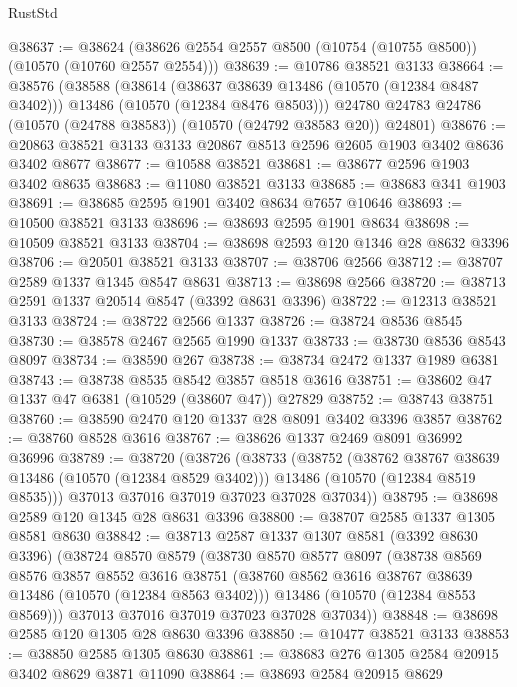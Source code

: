 \begin{lexlean}{RustStd}
\begin{coremodule}
@38637 := @38624 (@38626 @2554 @2557 @8500 (@10754 (@10755 @8500)) (@10570 (@10760 @2557 @2554)))
@38639 := @10786 @38521 @3133
@38664 := @38576
    (@38588
      (@38614
        (@38637 @38639 @13486 (@10570 (@12384 @8487 @3402)))
        @13486
        (@10570 (@12384 @8476 @8503)))
      @24780
      @24783
      @24786
      (@10570 (@24788 @38583))
      (@10570 (@24792 @38583 @20))
      @24801)
@38676 := @20863 @38521 @3133 @3133 @20867 @8513 @2596 @2605 @1903 @3402 @8636 @3402 @8677
@38677 := @10588 @38521
@38681 := @38677 @2596 @1903 @3402 @8635
@38683 := @11080 @38521 @3133
@38685 := @38683 @341 @1903
@38691 := @38685 @2595 @1901 @3402 @8634 @7657 @10646
@38693 := @10500 @38521 @3133
@38696 := @38693 @2595 @1901 @8634
@38698 := @10509 @38521 @3133
@38704 := @38698 @2593 @120 @1346 @28 @8632 @3396
@38706 := @20501 @38521 @3133
@38707 := @38706 @2566
@38712 := @38707 @2589 @1337 @1345 @8547 @8631
@38713 := @38698 @2566
@38720 := @38713 @2591 @1337 @20514 @8547 (@3392 @8631 @3396)
@38722 := @12313 @38521 @3133
@38724 := @38722 @2566 @1337
@38726 := @38724 @8536 @8545
@38730 := @38578 @2467 @2565 @1990 @1337
@38733 := @38730 @8536 @8543 @8097
@38734 := @38590 @267
@38738 := @38734 @2472 @1337 @1989 @6381
@38743 := @38738 @8535 @8542 @3857 @8518 @3616
@38751 := @38602 @47 @1337 @47 @6381 (@10529 (@38607 @47)) @27829
@38752 := @38743 @38751
@38760 := @38590 @2470 @120 @1337 @28 @8091 @3402 @3396 @3857
@38762 := @38760 @8528 @3616
@38767 := @38626 @1337 @2469 @8091 @36992 @36996
@38789 := @38720
    (@38726
      (@38733
        (@38752
          (@38762 @38767 @38639 @13486 (@10570 (@12384 @8529 @3402)))
          @13486
          (@10570 (@12384 @8519 @8535)))
        @37013
        @37016
        @37019
        @37023
        @37028
        @37034))
@38795 := @38698 @2589 @120 @1345 @28 @8631 @3396
@38800 := @38707 @2585 @1337 @1305 @8581 @8630
@38842 := @38713
    @2587
    @1337
    @1307
    @8581
    (@3392 @8630 @3396)
    (@38724
      @8570
      @8579
      (@38730
        @8570
        @8577
        @8097
        (@38738
          @8569
          @8576
          @3857
          @8552
          @3616
          @38751
          (@38760 @8562 @3616 @38767 @38639 @13486 (@10570 (@12384 @8563 @3402)))
          @13486
          (@10570 (@12384 @8553 @8569)))
        @37013
        @37016
        @37019
        @37023
        @37028
        @37034))
@38848 := @38698 @2585 @120 @1305 @28 @8630 @3396
@38850 := @10477 @38521 @3133
@38853 := @38850 @2585 @1305 @8630
@38861 := @38683 @276 @1305 @2584 @20915 @3402 @8629 @3871 @11090
@38864 := @38693 @2584 @20915 @8629

\end{coremodule}
\end{lexlean}
